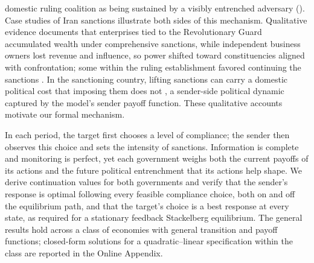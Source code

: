 domestic ruling coalition as being sustained by a visibly entrenched adversary
(). Case studies of Iran sanctions illustrate both sides
of this mechanism. Qualitative evidence documents that enterprises tied to the
Revolutionary Guard accumulated wealth under comprehensive sanctions, while
independent business owners lost revenue and influence, so power shifted toward
constituencies aligned with confrontation; some within the ruling establishment
favored continuing the sanctions
\citep[pp.~51--52]{BajoghliNasrSalehiIsfahaniVaez2024}. In the sanctioning country,
lifting sanctions can carry a domestic political cost that imposing them does not
\citep[p.~118]{BajoghliNasrSalehiIsfahaniVaez2024}, a sender-side political dynamic
captured by the model's sender payoff function. These qualitative accounts motivate
our formal mechanism.

 In each
period, the target first chooses a level of compliance; the sender then observes
this choice and sets the intensity of sanctions. Information is complete and
monitoring is perfect, yet each government weighs both the current payoffs of its
actions and the future political entrenchment that its actions help shape. We
derive continuation values for both governments and verify that the sender's
response is optimal following every feasible compliance choice, both on and off
the equilibrium path, and that the target's choice is a best response at every
state, as required for a stationary feedback Stackelberg equilibrium. The general
results hold across a class of economies with general transition and payoff
functions; closed-form solutions for a quadratic--linear specification within the
class are reported in the Online Appendix.

